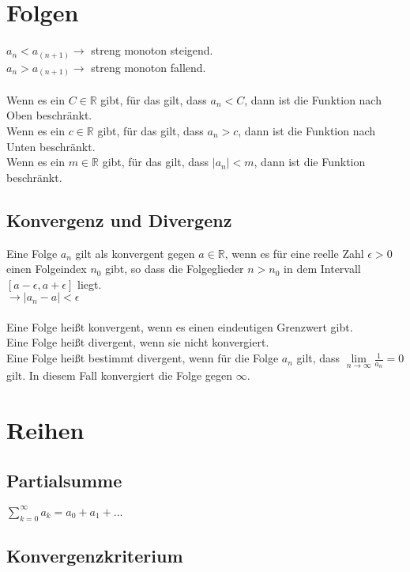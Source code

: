 \documentclass[a4paper,landscape, 11pt]{article}
\newcommand{\limFromTo}[2]{ \lim\limits_{#2 \rightarrow #1}}
\begin{document}
\begin{multicols}{4}
\begin{small}
    \section{Folgen}
    $a_n < a_(n+1) \rightarrow$ streng monoton steigend. \\
    $a_n > a_(n+1) \rightarrow$ streng monoton fallend. \\ 
    \\ 
    Wenn es ein $C \in \mathbb{R}$ gibt, für das gilt, dass $a_n < C$, dann ist die Funktion nach Oben beschränkt. \\
    Wenn es ein $c \in \mathbb{R}$ gibt, für das gilt, dass $a_n > c$, dann ist die Funktion nach Unten beschränkt. \\
    Wenn es ein $m \in \mathbb{R}$ gibt, für das gilt, dass $ | a_n | < m$, dann ist die Funktion beschränkt.
        
        \subsection{Konvergenz und Divergenz}
            
            Eine Folge $a_n$ gilt als konvergent gegen $a \in \mathbb{R}$, wenn es für eine reelle Zahl $\epsilon > 0$ einen Folgeindex $n_0$ gibt, so dass die Folgeglieder $n>n_0$ in dem Intervall $\left[ a - \epsilon, a + \epsilon \right] $ liegt.\\
            $\rightarrow | a_n - a | < \epsilon$
            \\ \\
            Eine Folge heißt konvergent, wenn es einen eindeutigen Grenzwert gibt. \\
            Eine Folge heißt divergent, wenn sie nicht konvergiert. \\
            Eine Folge heißt bestimmt divergent, wenn für die Folge $a_n$ gilt, dass $\limFromTo{\infty}{n}\frac{1}{a_n} = 0$ gilt. In diesem Fall konvergiert die Folge gegen $\infty$.
    \section{Reihen}
        \subsection{Partialsumme}
            $\sum_{k=0}^{\infty} a_k = a_0 + a_1 + ... $
        \subsection{Konvergenzkriterium}

\end{small}
\end{multicols}
\end{document}
